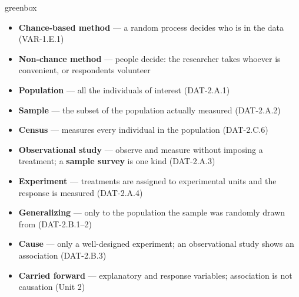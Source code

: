 \documentclass[10pt]{article}
\begin{document}
\boxguard
\begin{skillbox}{greenbox}
\begin{minipage}[t]{0.48\linewidth}
    \begin{itemize}
        \item \textbf{Chance-based method} --- a random process decides who is in the data
              (VAR-1.E.1)
        \item \textbf{Non-chance method} --- people decide: the researcher takes whoever is
              convenient, or respondents volunteer
        \item \textbf{Population} --- all the individuals of interest (DAT-2.A.1)
        \item \textbf{Sample} --- the subset of the population actually measured
              (DAT-2.A.2)
        \item \textbf{Census} --- measures every individual in the population (DAT-2.C.6)
    \end{itemize}
\end{minipage}
\hfill
\begin{minipage}[t]{0.48\linewidth}
    \begin{itemize}
        \item \textbf{Observational study} --- observe and measure without imposing a
              treatment; a \textbf{sample survey} is one kind (DAT-2.A.3)
        \item \textbf{Experiment} --- treatments are assigned to experimental units and the
              response is measured (DAT-2.A.4)
        \item \textbf{Generalizing} --- only to the population the sample was randomly drawn
              from (DAT-2.B.1--2)
        \item \textbf{Cause} --- only a well-designed experiment; an observational study shows
              an association (DAT-2.B.3)
        \item \textbf{Carried forward} --- explanatory and response variables; association is
              not causation (Unit 2)
    \end{itemize}
\end{minipage}
\end{skillbox}
\end{document}
